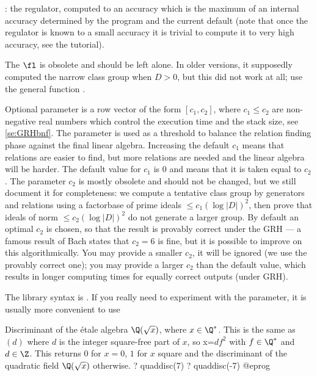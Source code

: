 \item {}: the regulator, computed to an accuracy which is the
maximum of an internal accuracy determined by the program and the current
default (note that once the regulator is known to a small accuracy it is
trivial to compute it to very high accuracy, see the tutorial).

The $\fl$ is obsolete and should be left alone. In older versions,
it supposedly computed the narrow class group when $D>0$, but this did not
work at all; use the general function .

Optional parameter  is a row vector of the form $[c_1, c_2]$,
where $c_1 \leq c_2$ are non-negative real numbers which control the execution
time and the stack size, see \ref{se:GRHbnf}. The parameter is used as a
threshold to balance the relation finding phase against the final linear
algebra. Increasing the default $c_1$ means that relations are easier
to find, but more relations are needed and the linear algebra will be
harder. The default value for $c_1$ is $0$ and means that it is taken equal
to $c_2$. The parameter $c_2$ is mostly obsolete and should not be changed,
but we still document it for completeness: we compute a tentative class
group by generators and relations using a factorbase of prime ideals
$\leq c_1 (\log |D|)^2$, then prove that ideals of norm
$\leq c_2 (\log |D|)^2$ do
not generate a larger group. By default an optimal $c_2$ is chosen, so that
the result is provably correct under the GRH --- a famous result of Bach
states that $c_2 = 6$ is fine, but it is possible to improve on this
algorithmically. You may provide a smaller $c_2$, it will be ignored
(we use the provably correct
one); you may provide a larger $c_2$ than the default value, which results
in longer computing times for equally correct outputs (under GRH).

The library syntax is .
If you really need to experiment with the  parameter, it is
usually more convenient to use

\label{se:quaddisc}
Discriminant of the \'etale algebra $\Q(\sqrt{x})$, where $x\in\Q^*$.
This is the same as $(d)$ where $d$ is the integer square-free
part of $x$, so x=$d f^2$ with $f\in \Q^*$ and $d\in\Z$.
This returns $0$ for $x = 0$, $1$ for $x$ square and the discriminant of the
quadratic field $\Q(\sqrt{x})$ otherwise.
\bprog
? quaddisc(7)
? quaddisc(-7)
@eprog

